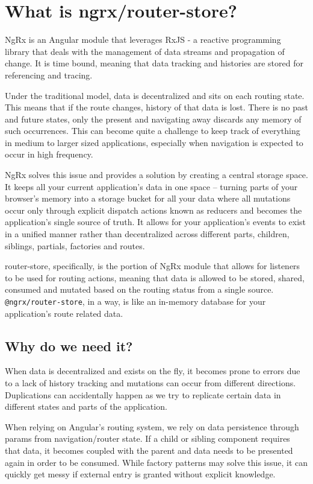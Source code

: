 
\chapter{ What is ngrx/router-store? }

NgRx is an Angular module that leverages RxJS -  a reactive programming library
that deals with the management of data streams and propagation of change. It is
time bound, meaning that data tracking and histories are stored for referencing
and tracing.

Under the traditional model, data is decentralized and sits on each routing
state. This means that if the route changes, history of that data is lost. There
is no past and future states, only the present and navigating away discards any
memory of such occurrences. This can become quite a challenge to keep track of
everything in medium to larger sized applications, especially when navigation
is expected to occur in high frequency.

NgRx solves this issue and provides a solution by creating a central storage
space. It keeps all your current application’s data in one space – turning parts
of your browser’s memory into a  storage bucket for all your data where all
mutations occur only through explicit dispatch actions known as reducers and
becomes the application’s single source of truth. It allows for your
application’s events to exist in a unified manner rather than decentralized
across different parts, children, siblings, partials, factories and routes.

router-store, specifically, is the portion of NgRx module that allows for
listeners to be used for routing actions, meaning that data is allowed to be
stored, shared, consumed and mutated based on the routing status from
a single source. \texttt{@ngrx/router-store}, in a way, is like an in-memory database
for your application’s route related data.

\section{Why do we need it?}
When data is decentralized and exists on the fly, it becomes prone to errors due
to a lack of history tracking and mutations can occur from different directions.
Duplications can accidentally happen as we try to replicate certain data in
different states and parts of the application.

When relying on Angular’s routing system, we rely on data persistence through
params from navigation/router state. If a child or sibling component requires
that data, it becomes coupled with the parent and data needs to be presented
again in order to be consumed. While factory patterns may solve this issue, it
can quickly get messy if external entry is granted without explicit knowledge.

